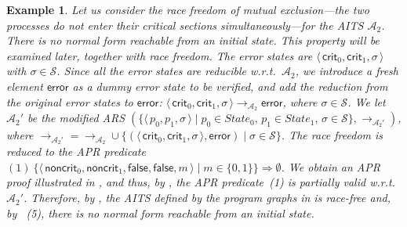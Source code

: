 \documentclass[10pt,a4paper]{article}
\newtheorem{example}[theorem]{Example}
\newcommand{\bfnum}[1]{(#1)}
\def\cA{\mathcal{A}}
\def\cS{\mathcal{S}}
\newcommand{\symb}[1]{\mathsf{#1}}
\newcommand{\ReachPred}[2]{#1 \Rightarrow #2}
\def\cApet{\cA_2}
\newcommand{\State}[1]{\langle\, #1 \,\rangle}
\newcommand{\StateSet}[1]{\mathit{State}_{#1}}
\begin{document}
\begin{example}
	Let us consider the \emph{race freedom} of mutual exclusion---the two processes do not enter their critical sections simultaneously---for the AITS $\cApet$.
	There is no normal form reachable from an initial state.
	This property will be examined later, together with race freedom.
	The error states are $\State{\symb{crit}_0,\symb{crit}_1,\sigma}$ with $\sigma \in \cS$.
	Since all the error states are reducible w.r.t.\ $\cApet$,
	we introduce a fresh element $\symb{error}$ as a dummy error state to be verified, and add
	the reduction from the original error states to $\symb{error}$:
	$\State{\symb{crit}_0,\symb{crit}_1,\sigma} \to_{\cApet} \symb{error}$, where $\sigma \in \cS$.
	We let $\cApet'$ be the modified ARS $(\{ \State{p_0,p_1,\sigma} \mid p_0 \in \StateSet{0}, \, p_1 \in \StateSet{1}, \, \sigma \in \cS \},\to_{\cApet'})$, where
	${\to_{\cApet'}} = {\to_{\cApet}} \cup \{ (\State{\symb{crit}_0,\symb{crit}_1,\sigma}, \symb{error}) \mid \sigma \in \cS \}$.
	The race freedom is reduced to the APR predicate
	$
		(1) ~
		\ReachPred{\{ \State{\symb{noncrit}_0,\symb{noncrit}_1,\symb{false},\symb{false},m} \mid m \in \{0,1\} \}}{\emptyset}
	$.
	We obtain an APR proof illustrated in , and thus, by ,
	the APR predicate~(1) is partially valid w.r.t.\ $\cApet'$.
	Therefore,
	by , the AITS defined by the program graphs in  is race-free and, by ~\bfnum{5}, there is no normal form reachable from an initial state.
\end{example}
\end{document}
